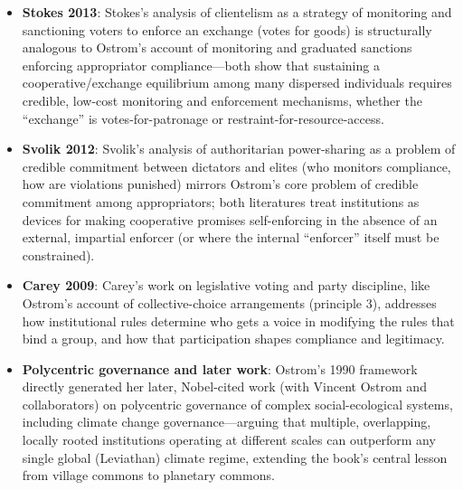 \documentclass[12pt]{article}
\begin{document}
\begin{itemize}[leftmargin=*, itemsep=4pt]
    \item \textbf{Stokes 2013}: Stokes's analysis of clientelism as a strategy of monitoring and sanctioning voters to enforce an exchange (votes for goods) is structurally analogous to Ostrom's account of monitoring and graduated sanctions enforcing appropriator compliance---both show that sustaining a cooperative/exchange equilibrium among many dispersed individuals requires credible, low-cost monitoring and enforcement mechanisms, whether the ``exchange'' is votes-for-patronage or restraint-for-resource-access.
    \item \textbf{Svolik 2012}: Svolik's analysis of authoritarian power-sharing as a problem of credible commitment between dictators and elites (who monitors compliance, how are violations punished) mirrors Ostrom's core problem of credible commitment among appropriators; both literatures treat institutions as devices for making cooperative promises self-enforcing in the absence of an external, impartial enforcer (or where the internal ``enforcer'' itself must be constrained).
    \item \textbf{Carey 2009}: Carey's work on legislative voting and party discipline, like Ostrom's account of collective-choice arrangements (principle 3), addresses how institutional rules determine who gets a voice in modifying the rules that bind a group, and how that participation shapes compliance and legitimacy.
    \item \textbf{Polycentric governance and later work}: Ostrom's 1990 framework directly generated her later, Nobel-cited work (with Vincent Ostrom and collaborators) on polycentric governance of complex social-ecological systems, including climate change governance---arguing that multiple, overlapping, locally rooted institutions operating at different scales can outperform any single global (Leviathan) climate regime, extending the book's central lesson from village commons to planetary commons.
\end{itemize}
\end{document}
